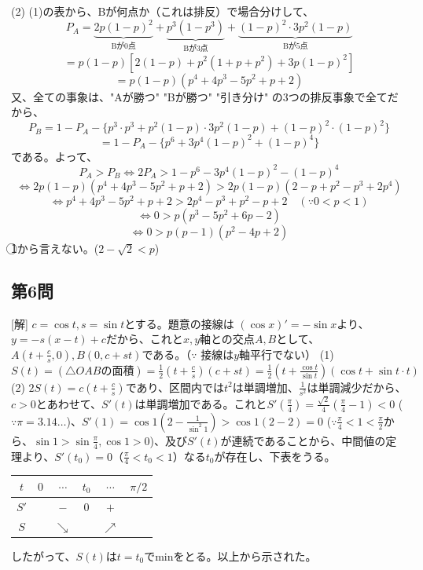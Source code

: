 \documentclass[../main.tex]{subfiles}
\begin{document}
(2) (1)の表から、Bが何点か（これは排反）で場合分けして、
$$
P_A = \underbrace{2p(1-p)^2}_{\text{Bが0点}} + \underbrace{p^3(1-p^3)}_{\text{Bが3点}} + \underbrace{(1-p)^2 \cdot 3p^2(1-p)}_{\text{Bが5点}}
$$
$$
= p(1-p) \left[ 2(1-p) + p^2(1+p+p^2) + 3p(1-p)^2 \right]
$$
$$
= p(1-p) (p^4 + 4p^3 - 5p^2 + p + 2)
$$
又、全ての事象は、"Aが勝つ" "Bが勝つ" "引き分け" の3つの排反事象で全てだから、
$$
P_B = 1 - P_A - \{ p^3 \cdot p^3 + p^2(1-p) \cdot 3p^2(1-p) + (1-p)^2 \cdot (1-p)^2 \}
$$
$$
= 1 - P_A - \{ p^6 + 3p^4(1-p)^2 + (1-p)^4 \}
$$
である。よって、
$$
P_A > P_B \Leftrightarrow 2P_A > 1 - p^6 - 3p^4(1-p)^2 - (1-p)^4
$$
$$
\Leftrightarrow 2p(1-p)(p^4 + 4p^3 - 5p^2 + p + 2) > 2p(1-p)(2 - p + p^2 - p^3 + 2p^4)
$$
$$
\Leftrightarrow p^4 + 4p^3 - 5p^2 + p + 2 > 2p^4 - p^3 + p^2 - p + 2 \quad (\because 0 < p < 1)
$$
$$
\Leftrightarrow 0 > p(p^3 - 5p^2 + 6p - 2)
$$
$$
\Leftrightarrow 0 > p(p-1)(p^2 - 4p + 2)
$$
\textcircled{1}から言えない。($2-\sqrt{2} < p$)

\subsection*{第6問}
[解] $c = \cos t, s = \sin t$とする。題意の接線は $(\cos x)' = -\sin x$より、$y = -s(x-t) + c$だから、これと$x, y$軸との交点$A, B$として、$A(t + \frac{c}{s}, 0), B(0, c+st)$である。（$\because$ 接線は$y$軸平行でない）
(1) $S(t) = (\triangle OAB\text{の面積}) = \frac{1}{2}\left(t + \frac{c}{s}\right)(c+st) = \frac{1}{2}\left(t + \frac{\cos t}{\sin t}\right)(\cos t + \sin t \cdot t)$
(2) $2S(t) = c\left(t+\frac{c}{s}\right)$であり、区間内では$t^2$は単調増加、$\frac{1}{s^2}$は単調減少だから、$c > 0$とあわせて、$S'(t)$は単調増加である。これと$S'(\frac{\pi}{4}) = \frac{\sqrt{2}}{4}(\frac{\pi}{4}-1) < 0$ ($\because \pi=3.14\dots$)、$S'(1) = \cos 1 (2 - \frac{1}{\sin^2 1}) > \cos 1 (2-2) = 0$ ($\because \frac{\pi}{4} < 1 < \frac{\pi}{2}$から、$\sin 1 > \sin\frac{\pi}{4}, \cos 1 > 0$)、及び$S'(t)$が連続であることから、中間値の定理より、$S'(t_0) = 0$（$\frac{\pi}{4} < t_0 < 1$）なる$t_0$が存在し、下表をうる。
\begin{center}
  \begin{tabular}{|c|c|c|c|c|c|}
    \hline
    $t$ & $0$ & $\cdots$ & $t_0$ & $\cdots$ & $\pi/2$ \\ \hline
    $S'$ & & $-$ & $0$ & $+$ & \\ \hline
    $S$ & & $\searrow$ & & $\nearrow$ & \\ \hline
  \end{tabular}
\end{center}
したがって、$S(t)$は$t=t_0$でminをとる。以上から示された。
\end{document}
